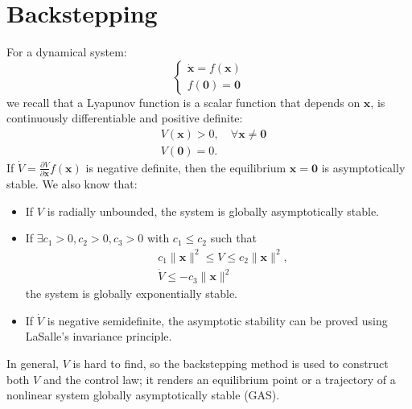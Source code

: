 \documentclass[10pt, a4paper]{report}
\begin{document}
\section{Backstepping}
For a dynamical system:\begin{equation}
    \begin{cases}
        \dot{\mathbf x}=f(\mathbf x)\\ 
        f(\mathbf 0)=\mathbf 0
    \end{cases}
\end{equation}
we recall that a Lyapunov function is a scalar function that depends on $\mathbf x$, is continuously differentiable and positive definite:\begin{align}
    &V(\mathbf x)>0,\quad \forall \mathbf x\ne\mathbf 0\\
    &V(\mathbf 0)=0.
\end{align}
If $\dot V=\frac{\partial V}{\partial \mathbf x}f(\mathbf x)$ is negative definite, then the equilibrium $\mathbf x=\mathbf 0$ is asymptotically stable. We also know that:\begin{itemize}
    \item If $V$ is radially unbounded, the system is globally asymptotically stable.
    \item If $\exists c_1>0,c_2>0,c_3>0$ with $c_1\le c_2$ such that \begin{align}
        &c_1\|\mathbf x\|^2\le V\le c_2\|\mathbf x\|^2,\\
        &\dot V \le -c_3\|\mathbf x\|^2
    \end{align}
    the system is globally exponentially stable.
    \item If $\dot V$ is negative semidefinite, the asymptotic stability can be proved using LaSalle's invariance principle.
\end{itemize}
In general, $V$ is hard to find, so the backstepping method is used to construct both $V$ and the control law; it renders an equilibrium point or a trajectory of a nonlinear system globally asymptotically stable (GAS).
\end{document}
